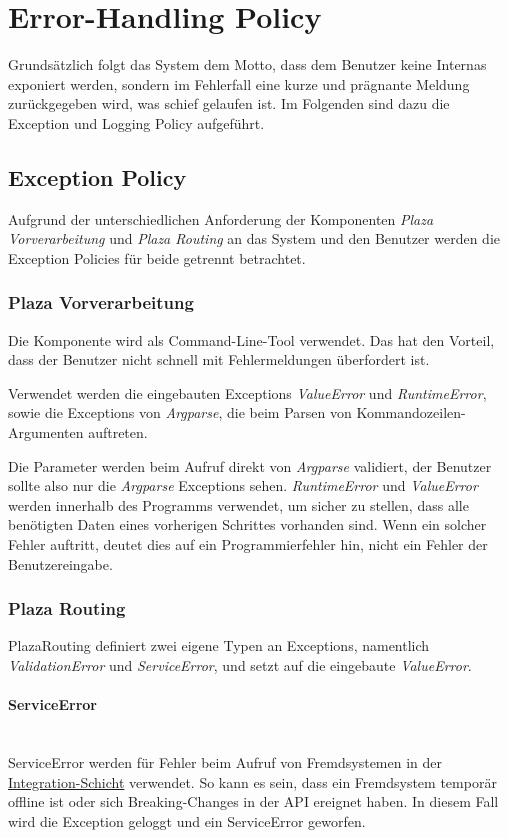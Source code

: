 
\section{Error-Handling Policy}
\label{sec:Error-Handling Policy}
Grundsätzlich folgt das System dem Motto, dass dem Benutzer keine Internas exponiert werden, sondern im Fehlerfall eine kurze und prägnante Meldung zurückgegeben wird, was schief gelaufen ist. Im Folgenden sind dazu die Exception und Logging Policy aufgeführt.

\subsection{Exception Policy}
\label{ehp:Exception Policy}
Aufgrund der unterschiedlichen Anforderung der Komponenten \emph{Plaza Vorverarbeitung} und \emph{Plaza Routing} an das System und den Benutzer werden die Exception Policies für beide getrennt betrachtet.

\subsubsection{Plaza Vorverarbeitung}
\label{ehp:Plaza Vorverarbeitung}
Die Komponente wird als Command-Line-Tool verwendet. Das hat den Vorteil, dass der Benutzer nicht schnell mit Fehlermeldungen überfordert ist. 

Verwendet werden die eingebauten Exceptions \emph{ValueError} und \emph{RuntimeError}, sowie die Exceptions von \emph{Argparse}, die beim Parsen von Kommandozeilen-Argumenten auftreten.

Die Parameter werden beim Aufruf direkt von \emph{Argparse} validiert, der Benutzer sollte also nur die \emph{Argparse} Exceptions sehen. \emph{RuntimeError} und \emph{ValueError} werden innerhalb des Programms verwendet, um sicher zu stellen, dass alle benötigten Daten eines vorherigen Schrittes vorhanden sind. Wenn ein solcher Fehler auftritt, deutet dies auf ein Programmierfehler hin, nicht ein Fehler der Benutzereingabe.

\subsubsection{Plaza Routing}
\label{ehp:Plaza Routing}
PlazaRouting definiert zwei eigene Typen an Exceptions, namentlich \emph{ValidationError} und \emph{ServiceError}, und setzt auf die eingebaute \emph{ValueError}. 

\paragraph{ServiceError}\label{ehp:PR:ServiceError}~\\
ServiceError werden für Fehler beim Aufruf von Fremdsystemen in der \hyperref[architektur:integration-layer]{Integration-Schicht} verwendet. So kann es sein, dass ein Fremdsystem temporär offline ist oder sich Breaking-Changes in der \ac{API} ereignet haben. In diesem Fall wird die Exception geloggt und ein ServiceError geworfen.

